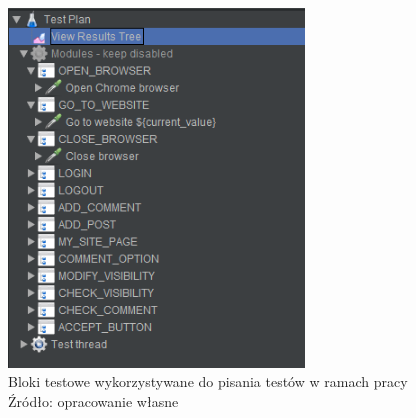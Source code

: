 \begin{figure}[H]
\centering
\captionsetup{justification=centering}
\includegraphics[width=0.7\textwidth]{Modules.PNG}
\caption[Bloki testowe wykorzystywane do pisania testów w ramach pracy]{\label{fig:ham}Bloki testowe wykorzystywane do pisania testów w ramach pracy \\ Źródło: opracowanie własne}
\end{figure}

